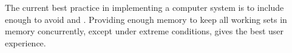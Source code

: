 \begin{remark*}
  The current best practice in implementing a computer system is to include enough  to avoid  and .
  Providing enough memory to keep all working sets in memory concurrently, except under extreme conditions, gives the best user experience.
\end{remark*}


